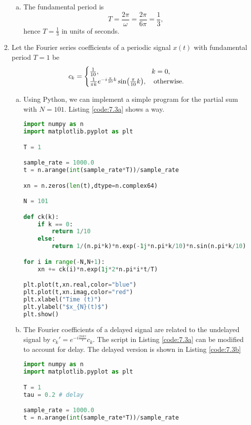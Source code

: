\begin{enumerate}
\begin{enumerate}[a)]
\item The fundamental period is
$$T=\frac{2\pi}{\omega}=\frac{2\pi}{6\pi}=\frac{1}{3},$$
hence $T=\frac{1}{3}$ in units of seconds.
\end{enumerate}


\item Let the Fourier series coefficients of a periodic signal $x(t)$ with fundamental period $T=1$ be 
$$c_{k}=\begin{cases}
    \frac{1}{10}, \hspace{2.3cm}\quad k=0, \\
    \frac{1}{\pi k}e^{-i\frac{\pi}{10}k}\sin(\frac{\pi}{10}k),\quad \text{otherwise}.
\end{cases}$$

\begin{enumerate}[a)]
\item Using Python, we can implement a simple program for the partial sum with $N=101$. Listing \ref{code:7.3a} shows a way. 
\begin{lstlisting}[language=Python, caption=Suggested solution to a),label=code:7.3a]
import numpy as n
import matplotlib.pyplot as plt

T = 1

sample_rate = 1000.0
t = n.arange(int(sample_rate*T))/sample_rate

xn = n.zeros(len(t),dtype=n.complex64)

N = 101

def ck(k):
    if k == 0:
        return 1/10
    else:
        return 1/(n.pi*k)*n.exp(-1j*n.pi*k/10)*n.sin(n.pi*k/10)

for i in range(-N,N+1):
    xn += ck(i)*n.exp(1j*2*n.pi*i*t/T)

plt.plot(t,xn.real,color="blue")
plt.plot(t,xn.imag,color="red")
plt.xlabel("Time (t)")
plt.ylabel("$x_{N}(t)$")
plt.show()
\end{lstlisting}

\item The Fourier coefficients of a delayed signal are related to the undelayed signal by $c_{k}'=e^{-i\frac{2\pi k\tau}{T}}c_{k}$. 
The script in Listing \ref{code:7.3a} can be modified to account for delay. The delayed version is shown in Listing \ref{code:7.3b}
\begin{lstlisting}[language=Python, caption=Suggested solution to b),label=code:7.3b]
import numpy as n
import matplotlib.pyplot as plt

T = 1
tau = 0.2 # delay

sample_rate = 1000.0
t = n.arange(int(sample_rate*T))/sample_rate


\end{lstlisting}
\end{enumerate}
\end{enumerate}
